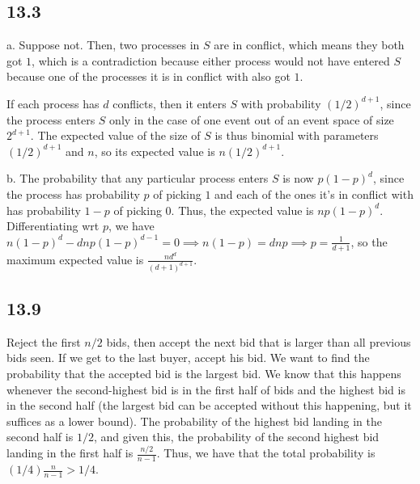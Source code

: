 \documentclass{article}
\begin{document}
\subsection*{13.3}
a. Suppose not. Then, two processes in $S$ are in conflict, which means they both got $1$, which is a contradiction because either process would not have entered $S$ because one of the processes it is in conflict with also got $1$. 

If each process has $d$ conflicts, then it enters $S$ with probability $(1/2)^{d+1}$, since the process enters $S$ only in the case of one event out of an event space of size $2^{d+1}$. The expected value of the size of $S$ is thus binomial with parameters $(1/2)^{d+1}$ and $n$, so its expected value is $n(1/2)^{d+1}$.

\noindent b. The probability that any particular process enters $S$ is now $p(1-p)^d$, since the process has probability $p$ of picking $1$ and each of the ones it's in conflict with has probability $1-p$ of picking $0$. Thus, the expected value is $np(1-p)^d$. Differentiating wrt $p$, we have $n(1-p)^d-dnp(1-p)^{d-1}=0\implies n(1-p)=dnp\implies p=\frac{1}{d+1}$, so the maximum expected value is $\frac{nd^d}{(d+1)^{d+1}}$.
\subsection*{13.9}
Reject the first $n/2$ bids, then accept the next bid that is larger than all previous bids seen. If we get to the last buyer, accept his bid. We want to find the probability that the accepted bid is the largest bid. We know that this happens whenever the second-highest bid is in the first half of bids and the highest bid is in the second half (the largest bid can be accepted without this happening, but it suffices as a lower bound). The probability of the highest bid landing in the second half is $1/2$, and given this, the probability of the second highest bid landing in the first half is $\frac{n/2}{n-1}$. Thus, we have that the total probability is $(1/4)\frac{n}{n-1}>1/4$.

\end{document}
